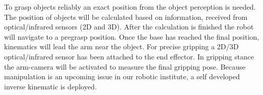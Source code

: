 To grasp objects reliably an exact position from the object perception is needed. The position of
objects will be calculated based on information, received from optical/infrared sensors (2D and 3D).
After the calculation is finished the robot will navigate to a pregrasp position. Once the base has
reached the final position, kinematics will lead the arm near the object. For precise gripping a
2D/3D optical/infrared sensor has been attached to the end effector. In gripping stance the arm-camera will be activated to measure the final gripping pose. Because manipulation is an upcoming
issue in our robotic institute, a self developed inverse kinematic is deployed.

